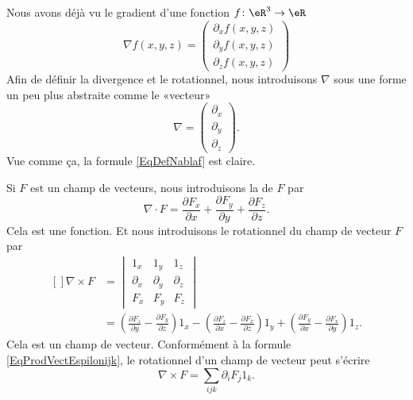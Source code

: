 Nous avons déjà vu le gradient d'une fonction $f\colon \eR^3\to \eR$
\begin{equation}        \label{EqDefNablaf}
    \nabla f(x,y,z)=\begin{pmatrix}
        \partial_xf(x,y,z)    \\ 
        \partial_yf(x,y,z)    \\ 
        \partial_zf(x,y,z)    
    \end{pmatrix}
\end{equation}
Afin de définir la divergence et le rotationnel, nous introduisons $\nabla$ sous une forme un peu plus abstraite comme le «vecteur»
\begin{equation}
    \nabla=\begin{pmatrix}
        \partial_x    \\ 
        \partial_y    \\ 
        \partial_z
    \end{pmatrix}.
\end{equation}
Vue comme ça, la formule \eqref{EqDefNablaf} est claire.

Si $F$ est un champ de vecteurs, nous introduisons la  de $F$ par
\begin{equation}
    \nabla\cdot F=\frac{ \partial F_x }{ \partial x }+\frac{ \partial F_y }{ \partial y }+\frac{ \partial F_z }{ \partial z }.
\end{equation}
Cela est une fonction. Et nous introduisons le rotationnel du champ de vecteur $F$ par
\begin{equation}
    \begin{aligned}[]
        \nabla\times F&=\begin{vmatrix}
              1_x  &   1_y    &   1_z    \\
            \partial_x    &   \partial_y    &   \partial_z    \\
            F_x    &   F_y    &   F_z
        \end{vmatrix}\\
        &=
        \left( \frac{ \partial F_z }{ \partial y }-\frac{ \partial F_y }{ \partial z } \right)1_x
        -\left( \frac{ \partial F_z }{ \partial x }-\frac{ \partial F_x }{ \partial z } \right)1_y
        +\left( \frac{ \partial F_y }{ \partial x }-\frac{ \partial F_x }{ \partial y } \right)1_z.
    \end{aligned}
\end{equation}
Cela est un champ de vecteur. Conformément à la formule \eqref{EqProdVectEspilonijk}, le rotationnel d'un champ de vecteur peut s'écrire
\begin{equation}
    \nabla\times F=\sum_{ijk}\partial_i F_j 1_k.
\end{equation}

